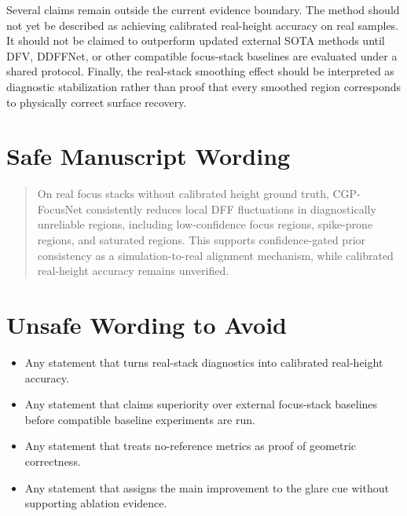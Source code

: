 \documentclass[11pt,a4paper]{article}
\newcommand{\method}{CGP-FocusNet}
\begin{document}
Several claims remain outside the current evidence boundary. The method should not yet be described as achieving calibrated real-height accuracy on real samples. It should not be claimed to outperform updated external SOTA methods until DFV, DDFFNet, or other compatible focus-stack baselines are evaluated under a shared protocol. Finally, the real-stack smoothing effect should be interpreted as diagnostic stabilization rather than proof that every smoothed region corresponds to physically correct surface recovery.

\section*{Safe Manuscript Wording}

\begin{quote}
On real focus stacks without calibrated height ground truth, \method{} consistently reduces local DFF fluctuations in diagnostically unreliable regions, including low-confidence focus regions, spike-prone regions, and saturated regions. This supports confidence-gated prior consistency as a simulation-to-real alignment mechanism, while calibrated real-height accuracy remains unverified.
\end{quote}

\section*{Unsafe Wording to Avoid}

\begin{itemize}
  \item Any statement that turns real-stack diagnostics into calibrated real-height accuracy.
  \item Any statement that claims superiority over external focus-stack baselines before compatible baseline experiments are run.
  \item Any statement that treats no-reference metrics as proof of geometric correctness.
  \item Any statement that assigns the main improvement to the glare cue without supporting ablation evidence.
\end{itemize}
\end{document}
